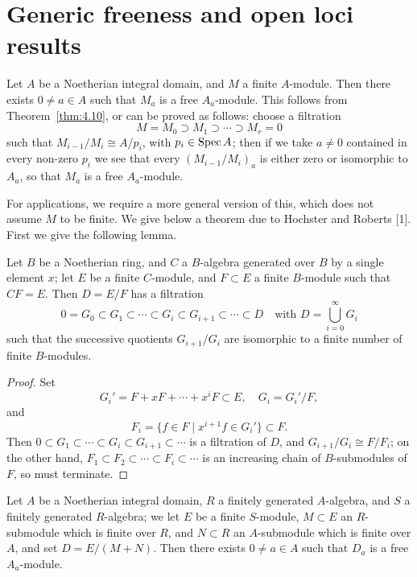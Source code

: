 \section{Generic freeness and open loci results}\label{sec:24}

Let $A$ be a Noetherian integral domain, and $M$ a finite $A$-module. Then there
exists $0 \ne a \in A$ such that $M_a$ is a free $A_a$-module. This follows from
Theorem~\ref{thm:4.10}, or can be proved as follows: choose a filtration
\[
  M = M_0 \supset M_1 \supset \cdots \supset M_r = 0
\]
such that $M_{i-1}/M_i \cong A/p_i$, with $p_i \in \operatorname{Spec} A$; then if we take $a \ne 0$
contained in every non-zero $p_i$ we see that every $(M_{i-1}/M_i)_a$ is either zero
or isomorphic to $A_a$, so that $M_a$ is a free $A_a$-module.

For applications, we require a more general version of this, which does not
assume $M$ to be finite. We give below a theorem due to Hochster and Roberts
[1]. First we give the following lemma.

\begin{lemma*}
Let $B$ be a Noetherian ring, and $C$ a $B$-algebra generated over $B$ by a single
element $x$; let $E$ be a finite $C$-module, and $F \subset E$ a finite $B$-module
such that $CF = E$. Then $D = E/F$ has a filtration
\[
  0 = G_0 \subset G_1 \subset \cdots \subset G_i \subset G_{i+1} \subset \cdots \subset D
      \quad \text{with } D = \bigcup_{i=0}^{\infty} G_i
\]
such that the successive quotients $G_{i+1}/G_i$ are isomorphic to a finite number
of finite $B$-modules.
\end{lemma*}

\begin{proof}
Set
\[
  G_i' = F + xF + \cdots + x^iF \subset E, \quad G_i = G_i'/F,
\]
and
\[
  F_i = \{f \in F \mid x^{i+1}f \in G_i'\} \subset F.
\]
Then $0 \subset G_1 \subset \cdots \subset G_i \subset G_{i+1} \subset \cdots$ is a filtration of
$D$, and $G_{i+1}/G_i \cong F/F_i$; on the other hand, $F_1 \subset F_2 \subset \cdots
\subset F_i \subset \cdots$ is an increasing chain of $B$-submodules of $F$, so must
terminate.
\end{proof}

\begin{theorem}\label{thm:24.1}
Let $A$ be a Noetherian integral domain, $R$ a finitely generated $A$-algebra, and
$S$ a finitely generated $R$-algebra; we let $E$ be a finite $S$-module,
$M \subset E$ an $R$-submodule which is finite over $R$, and $N \subset R$ an
$A$-submodule which is finite over $A$, and set $D = E/(M + N)$. Then there
exists $0 \ne a \in A$ such that $D_a$ is a free $A_a$-module.
\end{theorem}

